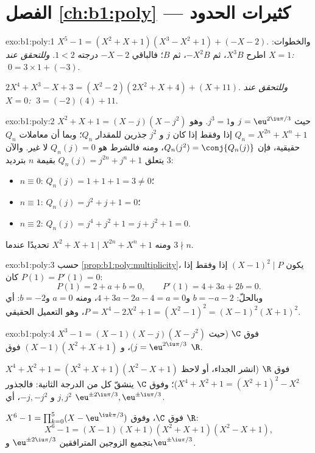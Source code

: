 \section*{الفصل \ref{ch:b1:poly} --- كثيرات الحدود}

\begin{solution}{exo:b1:poly:1}
$X^5 - 1 = (X^2 + X + 1)(X^3 - X^2 + 1) + (-X - 2)$. والخطوات: اطرح
$X^3 B$، ثم $-X^2 B$، ثم $B$؛ فالباقي $-X - 2$ درجته
$1 < 2$. \emph{وللتحقق عند $X = 1$:} $\;0 = 3 \times 1 + (-3)$.

$2X^4 + X^3 - X + 3 = (X^2 - 2)(2X^2 + X + 4) + (X + 11)$. \emph{وللتحقق
عند $X = 0$:} $\;3 = (-2)(4) + 11$.
\end{solution}

\begin{solution}{exo:b1:poly:2}
$X^2 + X + 1 = (X - j)(X - j^2)$ حيث $j = \eu^{2\iu\pi/3}$ و$j^3 =
1$. وهو  $Q_n = X^{2n} + X^n + 1$ إذا وفقط إذا كان $j$ و $j^2$ جذرين للمقدار
$Q_n$؛ وبما أن معاملات $Q_n$ حقيقية، فإن $Q_n(j^2) =
\conj{Q_n(j)}$، ومنه فالشرط هو $Q_n(j) = 0$ لا غير. والآن يتعلق $Q_n(j) =
j^{2n} + j^n + 1$ بقيمة $n$ بترديد $3$:
\begin{itemize}
  \item $n \equiv 0$: $Q_n(j) = 1 + 1 + 1 = 3 \neq 0$؛
  \item $n \equiv 1$: $Q_n(j) = j^2 + j + 1 = 0$؛
  \item $n \equiv 2$: $Q_n(j) = j^4 + j^2 + 1 = j + j^2 + 1 = 0$.
\end{itemize}
ومنه $X^2 + X + 1 \mid X^{2n} + X^n + 1$ تحديدًا عندما $3 \nmid n$.
\end{solution}

\begin{solution}{exo:b1:poly:3}
حسب \cref{prop:b1:poly:multiplicity}، يكون $(X-1)^2 \mid P$ إذا وفقط إذا كان $P(1) =
P'(1) = 0$:
\[
P(1) = 2 + a + b = 0, \qquad P'(1) = 4 + 3a + 2b = 0 .
\]
وبالحلّ: $b = -a - 2$ و$4 + 3a - 2a - 4 = a = 0$، ومنه $a = 0$ و$b =
-2$: أي $P = X^4 - 2X^2 + 1 = (X^2 - 1)^2 = (X-1)^2 (X+1)^2$، وهو
التعميل الحقيقي.
\end{solution}

\begin{solution}{exo:b1:poly:4}
$X^3 - 1 = (X - 1)(X - j)(X - j^2)$ فوق $\C$ (حيث $j = \eu^{2\iu\pi/3}$)،
و $(X - 1)(X^2 + X + 1)$ فوق $\R$.

$X^4 + X^2 + 1 = (X^2 + X + 1)(X^2 - X + 1)$ فوق $\R$ (انشر الجداء،
أو لاحظ $X^4 + X^2 + 1 = (X^2+1)^2 - X^2$)؛ وفوق $\C$ ينشقّ كل 
من الدرجة الثانية: فالجذور $j, j^2$ و $-j, -j^2$، أي $\eu^{\pm 2\iu\pi/3},
\eu^{\pm\iu\pi/3}$.

$X^6 - 1 = \prod_{k=0}^{5} (X - \eu^{\iu k\pi/3})$ فوق $\C$، وفوق
$\R$:
\[
X^6 - 1 = (X-1)(X+1)(X^2 + X + 1)(X^2 - X + 1),
\]
بتجميع الزوجين المترافقين $\eu^{\pm 2\iu\pi/3}$ و$\eu^{\pm
\iu\pi/3}$.
\end{solution}

